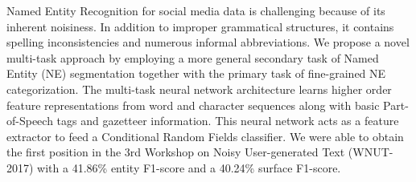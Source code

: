 Named Entity Recognition for social media data is challenging because of its inherent noisiness. In addition to improper grammatical structures, it contains spelling inconsistencies and numerous informal abbreviations. We propose a novel multi-task approach by employing a more general secondary task of Named Entity (NE) segmentation together with the primary task of fine-grained NE categorization. The multi-task neural network architecture learns higher order feature representations from word and character sequences along with basic Part-of-Speech tags and gazetteer information. This neural network acts as a feature extractor to feed a Conditional Random Fields classifier. We were able to obtain the first position in the 3rd Workshop on Noisy User-generated Text (WNUT-2017) with a 41.86\% entity F1-score and a 40.24\% surface F1-score.
